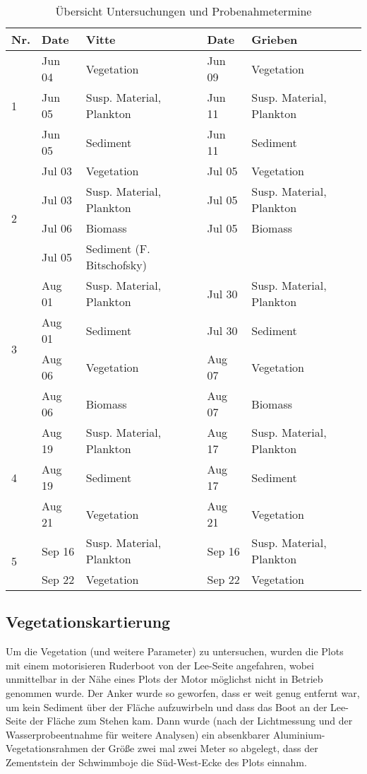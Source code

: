 \begin{table}[htb]
\caption{Übersicht Untersuchungen und Probenahmetermine}
\begin{tabular}{lllll}
\toprule
Nr. &  Date & Vitte & Date & Grieben\\
\midrule
\multirow{3}{*}{1} & Jun 04 & Vegetation & Jun 09 & Vegetation \\
 & Jun 05 & Susp. Material, Plankton & Jun 11 & Susp. Material, Plankton \\
 & Jun 05 & Sediment & Jun 11 & Sediment \\
\midrule
\multirow{4}{*}{2} & Jul 03 & Vegetation & Jul 05 & Vegetation \\
 & Jul 03 & Susp. Material, Plankton & Jul 05 & Susp. Material, Plankton \\
 & Jul 06 & Biomass  & Jul 05 & Biomass \\
 & Jul 05 & Sediment (F. Bitschofsky)\\
 \midrule
 \multirow{4}{*}{3} & Aug 01 & Susp. Material, Plankton & Jul 30 & Susp. Material, Plankton\\
 & Aug 01 & Sediment & Jul 30 & Sediment\\
 & Aug 06 & Vegetation & Aug 07 & Vegetation\\
 & Aug 06 & Biomass & Aug 07 & Biomass\\
 \midrule
 \multirow{3}{*}{4} & Aug 19 & Susp. Material, Plankton &  Aug 17 & Susp. Material, Plankton\\
 & Aug 19 & Sediment & Aug 17 & Sediment\\
 & Aug 21 & Vegetation & Aug 21 & Vegetation\\
 \midrule
 \multirow{2}{*}{5} & Sep 16 & Susp. Material, Plankton & Sep 16 & Susp. Material, Plankton\\
 & Sep 22 & Vegetation & Sep 22 & Vegetation
\bottomrule
\end{tabular}
\label{Probenahmetermine}
\end{table}




\subsection{Vegetationskartierung}

Um die Vegetation (und weitere Parameter) zu untersuchen, wurden die Plots mit einem motorisieren Ruderboot von der Lee-Seite angefahren, wobei unmittelbar in der Nähe eines Plots der Motor möglichst nicht in Betrieb genommen wurde. Der Anker wurde so geworfen, dass er weit genug entfernt war, um kein Sediment über der Fläche aufzuwirbeln und dass das Boot an der Lee-Seite der Fläche zum Stehen kam. Dann wurde (nach der Lichtmessung und der Wasserprobeentnahme für weitere Analysen) ein absenkbarer Aluminium-Vegetationsrahmen der Größe zwei mal zwei Meter so abgelegt, dass der Zementstein der Schwimmboje die Süd-West-Ecke des Plots einnahm.

